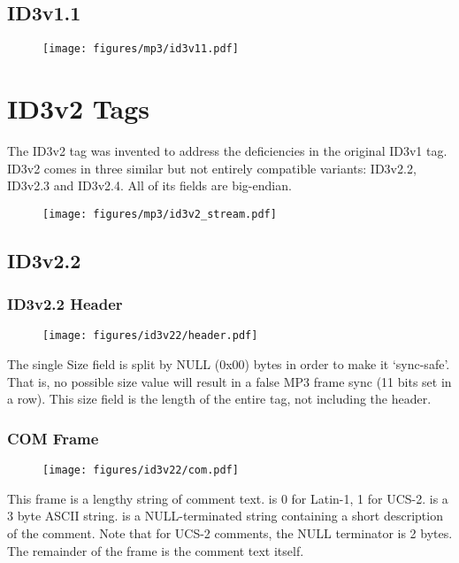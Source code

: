 \subsection{ID3v1.1}

\begin{figure}[h]
\texttt{[image: figures/mp3/id3v11.pdf]}
\end{figure}

\section{ID3v2 Tags}

The ID3v2 tag was invented to address the deficiencies in the original
ID3v1 tag.
ID3v2 comes in three similar but not entirely compatible variants:
ID3v2.2, ID3v2.3 and ID3v2.4.
All of its fields are big-endian.

\begin{figure}[h]
\texttt{[image: figures/mp3/id3v2\_stream.pdf]}
\end{figure}

\subsection{ID3v2.2}

\subsubsection{ID3v2.2 Header}

\begin{figure}[h]
\texttt{[image: figures/id3v22/header.pdf]}
\end{figure}
\par
\noindent
The single Size field is split by NULL (0x00) bytes in order to make
it `sync-safe'.
That is, no possible size value will result in a false
MP3 frame sync (11 bits set in a row).
This size field is the length of the entire tag, not including the header.

\subsubsection{COM Frame}
\begin{figure}[h]
\texttt{[image: figures/id3v22/com.pdf]}
\end{figure}
This frame is a lengthy string of comment text.
 is 0 for Latin-1, 1 for UCS-2.
 is a 3 byte ASCII string.
 is a NULL-terminated string
containing a short description of the comment.
Note that for UCS-2 comments, the NULL terminator is 2 bytes.
The remainder of the frame is the comment text itself.

